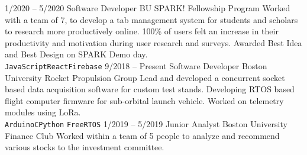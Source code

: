 \documentclass[9pt]{developercv} %
\begin{document}
\begin{entrylist}
	\entry
		{1/2020 -- 5/2020}
		{Software Developer}
		{BU SPARK! Fellowship Program}
		{Worked with a team of 7, to develop a tab management system for students and
		scholars to research more productively online. 100\% of users felt an increase in
		their productivity and motivation during user research and surveys. Awarded Best 
		Idea and Best Design on SPARK Demo day.\\
		\texttt{JavaScript}\slashsep\texttt{React}\slashsep\texttt{Firebase}}
	\entry
		{9/2018 -- Present}
		{Software Developer}	
		{Boston University Rocket Propulsion Group}
		{Lead and developed a concurrent socket based data acquisition software for custom test stands.
		Developing RTOS based flight computer firmware for sub-orbital launch vehicle. Worked 
		on telemetry modules using LoRa. \\\texttt{Arduino}\slashsep\texttt{C}\slashsep\texttt{Python}
		\slashsep\texttt{FreeRTOS}}
	\entry
		{1/2019 -- 5/2019}
		{Junior Analyst}
		{Boston University Finance Club}
		{Worked within a team of 5 people to analyze and recommend various stocks to the investment committee.}
		
\end{entrylist}
\end{document}
